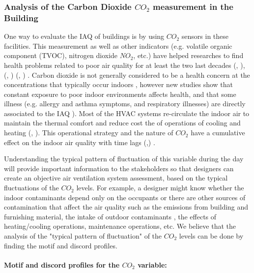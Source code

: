\subsubsection{Analysis of the Carbon Dioxide $CO_2$ measurement in the Building}
\label{section:CO2_analysis}

One way to evaluate the IAQ of buildings is by using $CO_2$ sensors in these facilities. This measurement as well as other indicators (e.g. volatile organic component (TVOC), nitrogen dioxide $NO_2$, etc.) have helped researches to find health problems related to poor air quality for at least the two last decades (\citeauthor{persily1997evaluating}, \citeyear{persily1997evaluating})\cite{persily1997evaluating}, (\citeauthor{lee2000indoor}, \citeyear{lee2000indoor})\cite{lee2000indoor} (\citeauthor{erdmann2002indoor}, \citeyear{erdmann2002indoor}) \cite{erdmann2002indoor}. Carbon dioxide is not generally considered to be a health concern at the concentrations that typically occur indoors \cite{persily1997evaluating}, however new studies show that constant exposure to poor indoor environments affects health, and that some illness (e.g. allergy and asthma symptoms, and respiratory illnesses) are directly associated to the IAQ \cite{erdmann2002indoor}). Most of the HVAC systems re-circulate the indoor air to maintain the thermal comfort and reduce cost the of operations of cooling and heating (\citeauthor{prill2000measure}, \citeyear{prill2000measure})\cite{prill2000measure}. This operational strategy and the nature of $CO_2$ have a cumulative effect on the indoor air quality with time lags (\citeauthor{dong2010information},\citeyear{dong2010information}) \cite{dong2010information}.  

Understanding the typical pattern of fluctuation of this variable during the day will provide important information to the stakeholders so that designers can create an objective air ventilation system assessment, based on the typical fluctuations of the $CO_2$ levels. For example, a designer might know whether the indoor contaminants depend only on the occupants or there are other sources of contamination that affect the air quality such as the emissions from building and furnishing material, the intake of outdoor contaminants \cite{persily1997evaluating}, the effects of heating/cooling operations, maintenance operations, etc. We believe that the analysis of the "typical pattern of fluctuation" of the $CO_2$ levels can be done by finding the motif and discord profiles.

\paragraph{Motif and discord profiles for the $CO_2$ variable:}
\label{motif_results}

